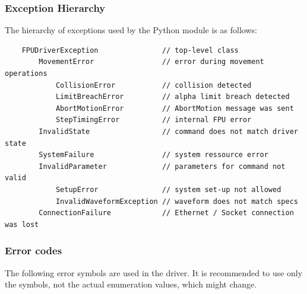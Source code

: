 \documentclass[11pt,a4paper]{report}
\begin{document}
\subsubsection{Exception Hierarchy}
\label{sec:ExceptionsReference}
The hierarchy of exceptions used by the Python module is as follows:

\begin{verbatim}
    FPUDriverException               // top-level class
        MovementError                // error during movement operations
            CollisionError           // collision detected
            LimitBreachError         // alpha limit breach detected
            AbortMotionError         // AbortMotion message was sent
            StepTimingError          // internal FPU error
        InvalidState                 // command does not match driver state
        SystemFailure                // system ressource error
        InvalidParameter             // parameters for command not valid
            SetupError               // system set-up not allowed
            InvalidWaveformException // waveform does not match specs
        ConnectionFailure            // Ethernet / Socket connection was lost
\end{verbatim}

\subsubsection{Error codes}
\label{sec:errorcodes}

The following error symbols are used in the driver.  It is recommended
to use only the symbols, not the actual enumeration values, which
might change.
\end{document}
